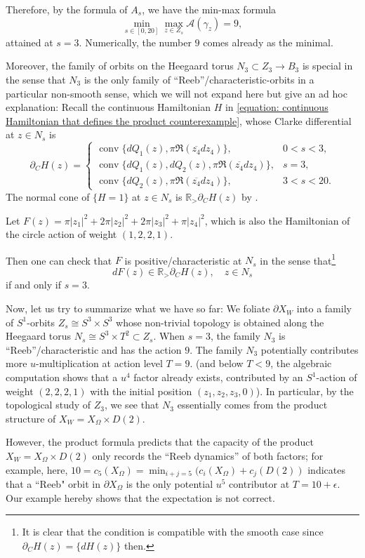 \documentclass[11pt]{amsart}
\numberwithin{equation}{section}
\theoremstyle{plain}
\theoremstyle{definition}
\theoremstyle{remark}
\newcommand{\bR} { {\mathbb{R}}}
\begin{document}
Therefore,  by the formula of $A_s$, we have the min-max formula
\[\min_{s\in [0,20]}\max_{z\in Z_s} \mathcal{A}(\gamma_z)= 9,\]
attained at $s=3$. Numerically, the number $9$ comes already as the minimal.

Moreover, the family of orbits on the Heegaard torus $N_3\subset Z_3\to B_3$ is special in the sense that $N_3$ is the only family of ``Reeb''/characteristic-orbits in a particular non-smooth sense, which we will not expand here but give an ad hoc explanation: Recall the continuous Hamiltonian $H$ in \autoref{equation: continuous Hamiltonian that defines the product counterexample},
whose Clarke differential \cite[Theorem 10.31]{RockafellarWets1998} at $z\in N_s$ is
\[\partial_C H(z)=\begin{cases}\operatorname{conv}\{dQ_1(z), \pi\Re(\overline{z_4}dz_4)\}, & 0<s<3,\\
\operatorname{conv}\{dQ_1(z),dQ_2(z),\pi\Re(\overline{z_4}dz_4)\},& s=3,\\
\operatorname{conv}\{ dQ_2(z),\pi\Re(\overline{z_4}dz_4)\},& 3<s<20.\end{cases}\]
The normal cone of $\{H=1\}$ at $z\in N_s$ is $\bR_>\partial_C H(z)$ by \cite[Theorem 6.14]{RockafellarWets1998}.

Let $F(z)=\pi|z_1|^2+2\pi|z_2|^2+2\pi|z_3|^2+\pi|z_4|^2$, which is also the Hamiltonian of the circle action of weight $(1,2,2,1)$. 

Then one can check that $F$ is positive/characteristic at $N_s$  in the sense that\footnote{It is clear that the condition is compatible with the smooth case since $\partial_C H(z)=\{dH(z)\}$ then.}
\[dF(z)\in \bR_>\partial_C H(z),\quad z\in N_s\]
if and only if $s=3$.



Now, let us try to summarize what we have so far: We foliate $\partial X_W$ into a family of $S^1$-orbits $Z_s\cong S^3\times S^3$ whose non-trivial topology is obtained along the Heegaard torus $N_s\cong  S^3\times T^2\subset Z_s$. When $s=3$, the family $N_3$ is ``Reeb''/characteristic and has the action $9$. The family $N_3$ potentially contributes more $u$-multiplication at action level $T=9$. (and below $T<9$, the algebraic computation shows that a $u^4$ factor already exists, contributed by an $S^1$-action of weight $(2,2,2,1)$ with the initial position $(z_1,z_2,z_3,0)$).
In particular, by the topological study of $Z_3$, we see that $N_3$ essentially comes from the product structure of $X_W=X_\Omega\times D(2)$.

However, the product formula predicts that the capacity of the product $X_W=X_\Omega\times D(2)$ only records the ``Reeb dynamics'' of both factors; for example, here, $10=c_5(X_\Omega)=\min_{i+j=5}(c_i(X_\Omega)+c_j(D(2))$ indicates that a ``Reeb" orbit in $\partial X_\Omega$ is the only potential $u^5$ contributor at $T=10+\epsilon$. Our example hereby shows that the expectation is not correct.
\end{document}
